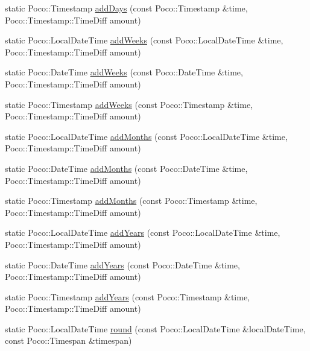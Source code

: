 \begin{DoxyCompactItemize}
\item 
static Poco\-::\-Timestamp \hyperlink{classofx_1_1_time_1_1_utils_a156e3294d8ca20599da46fc725444994}{add\-Days} (const Poco\-::\-Timestamp \&time, Poco\-::\-Timestamp\-::\-Time\-Diff amount)
\item 
static Poco\-::\-Local\-Date\-Time \hyperlink{classofx_1_1_time_1_1_utils_a0ae2cc5bd1ea9d1ca19fbaa3b56fffa1}{add\-Weeks} (const Poco\-::\-Local\-Date\-Time \&time, Poco\-::\-Timestamp\-::\-Time\-Diff amount)
\item 
static Poco\-::\-Date\-Time \hyperlink{classofx_1_1_time_1_1_utils_a0084c244ea63702a498144686de5a477}{add\-Weeks} (const Poco\-::\-Date\-Time \&time, Poco\-::\-Timestamp\-::\-Time\-Diff amount)
\item 
static Poco\-::\-Timestamp \hyperlink{classofx_1_1_time_1_1_utils_a015f9341a146f6f26b5c6e861bf3ed24}{add\-Weeks} (const Poco\-::\-Timestamp \&time, Poco\-::\-Timestamp\-::\-Time\-Diff amount)
\item 
static Poco\-::\-Local\-Date\-Time \hyperlink{classofx_1_1_time_1_1_utils_ad092f0c788c0e2252579547707149f72}{add\-Months} (const Poco\-::\-Local\-Date\-Time \&time, Poco\-::\-Timestamp\-::\-Time\-Diff amount)
\item 
static Poco\-::\-Date\-Time \hyperlink{classofx_1_1_time_1_1_utils_a770c756c1dc55365113452ea9c5774f9}{add\-Months} (const Poco\-::\-Date\-Time \&time, Poco\-::\-Timestamp\-::\-Time\-Diff amount)
\item 
static Poco\-::\-Timestamp \hyperlink{classofx_1_1_time_1_1_utils_a97ac78b827ea795d0a812b04739defbb}{add\-Months} (const Poco\-::\-Timestamp \&time, Poco\-::\-Timestamp\-::\-Time\-Diff amount)
\item 
static Poco\-::\-Local\-Date\-Time \hyperlink{classofx_1_1_time_1_1_utils_a650e36e4834b7893e86af813b12aec79}{add\-Years} (const Poco\-::\-Local\-Date\-Time \&time, Poco\-::\-Timestamp\-::\-Time\-Diff amount)
\item 
static Poco\-::\-Date\-Time \hyperlink{classofx_1_1_time_1_1_utils_aa6bd242fcfbd53e80c2a2301b7a54e14}{add\-Years} (const Poco\-::\-Date\-Time \&time, Poco\-::\-Timestamp\-::\-Time\-Diff amount)
\item 
static Poco\-::\-Timestamp \hyperlink{classofx_1_1_time_1_1_utils_a43949aedd840364f84c779c52af85e1e}{add\-Years} (const Poco\-::\-Timestamp \&time, Poco\-::\-Timestamp\-::\-Time\-Diff amount)
\item 
\hypertarget{classofx_1_1_time_1_1_utils_a142fdc5004bf5e44993480949cf5e2ae}{static Poco\-::\-Local\-Date\-Time \hyperlink{classofx_1_1_time_1_1_utils_a142fdc5004bf5e44993480949cf5e2ae}{round} (const Poco\-::\-Local\-Date\-Time \&local\-Date\-Time, const Poco\-::\-Timespan \&timespan)}\label{classofx_1_1_time_1_1_utils_a142fdc5004bf5e44993480949cf5e2ae}


\end{DoxyCompactItemize}

